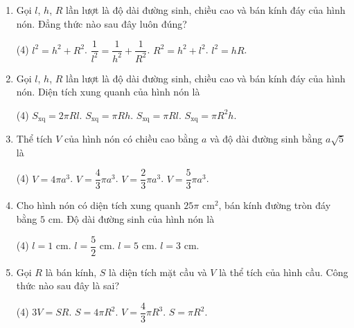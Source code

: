 \begin{practice}
\begin{enumerate}
        \item Gọi $l$, $h$, $R$ lần lượt là độ dài đường sinh, chiều cao và bán kính đáy của hình nón. Đẳng thức nào sau đây luôn đúng?
        \begin{tasks}(4)
            \task $l^2=h^2+R^2$.
            \task $\dfrac{1}{l^2}=\dfrac{1}{h^2}+\dfrac{1}{R^2}$.
            \task $R^2=h^2+l^2$.
            \task $l^2=hR$.
        \end{tasks}
        \par\noindent\answerbox\par

        \item Gọi $l$, $h$, $R$ lần lượt là độ dài đường sinh, chiều cao và bán kính đáy của hình nón. Diện tích xung quanh của hình nón là
        \begin{tasks}(4)
            \task $S_{\mathrm{xq}}=2\pi Rl$.
            \task $S_{\mathrm{xq}}=\pi Rh$.
            \task $S_{\mathrm{xq}}=\pi Rl$.
            \task $S_{\mathrm{xq}}=\pi R^2h$.
        \end{tasks}
        \par\noindent\answerbox\par

        \item Thể tích $V$ của hình nón có chiều cao bằng $a$ và độ dài đường sinh bằng $a\sqrt{5}$ là
        \begin{tasks}(4)
            \task $V=4\pi a^3$.
            \task $V=\dfrac{4}{3}\pi a^3$.
            \task $V=\dfrac{2}{3}\pi a^3$.
            \task $V=\dfrac{5}{3}\pi a^3$.
        \end{tasks}
        \par\noindent\answerbox\par

        \item Cho hình nón có diện tích xung quanh $25\pi$ cm$^2$, bán kính đường tròn đáy bằng $5$ cm. Độ dài đường sinh của hình nón là
        \begin{tasks}(4)
            \task $l=1$ cm.
            \task $l=\dfrac{5}{2}$ cm.
            \task $l=5$ cm.
            \task $l=3$ cm.
        \end{tasks}
        \par\noindent\answerbox\par

        \item Gọi $R$ là bán kính, $S$ là diện tích mặt cầu và $V$ là thể tích của hình cầu. Công thức nào sau đây là sai?
        \begin{tasks}(4)
            \task $3V=SR$.
            \task $S=4\pi R^2$.
            \task $V=\dfrac{4}{3}\pi R^3$.
            \task $S=\pi R^2$.
        \end{tasks}
        \par\noindent\answerbox\par


\end{enumerate}
\end{practice}

